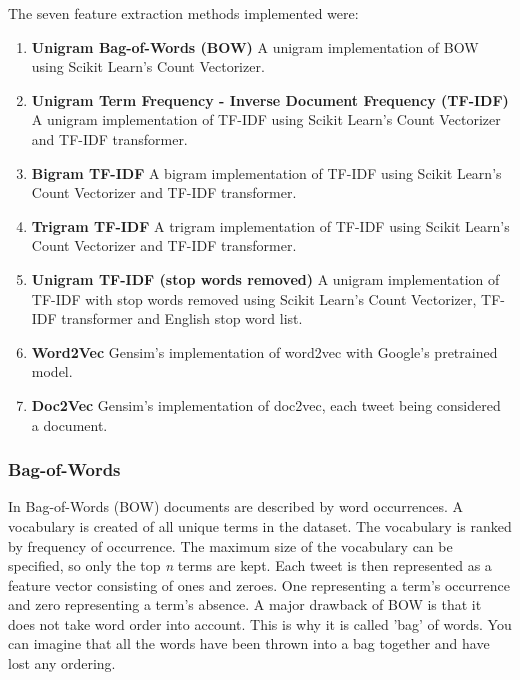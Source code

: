 The seven feature extraction methods implemented were:
\begin{enumerate}
    \item \textbf{Unigram Bag-of-Words (BOW)}\newline
    A unigram implementation of BOW using Scikit Learn's Count Vectorizer.
    \item \textbf{Unigram Term Frequency - Inverse Document Frequency (TF-IDF)}\newline
    A unigram implementation of TF-IDF using Scikit Learn's Count Vectorizer and TF-IDF transformer.
    \item \textbf{Bigram TF-IDF}\newline
    A bigram implementation of TF-IDF using Scikit Learn's Count Vectorizer and TF-IDF transformer.
    \item \textbf{Trigram TF-IDF} \newline
    A trigram implementation of TF-IDF using Scikit Learn's Count Vectorizer and TF-IDF transformer.
    \item \textbf{Unigram TF-IDF (stop words removed)}\newline
    A unigram implementation of TF-IDF with stop words removed using Scikit Learn's Count Vectorizer, TF-IDF transformer and English stop word list.
    \item \textbf{Word2Vec}\newline
    Gensim's implementation of word2vec with Google's pretrained model.    
    \item \textbf{Doc2Vec}\newline
    Gensim's implementation of doc2vec, each tweet being considered a document.
\end{enumerate}

\subsubsection{Bag-of-Words}

In Bag-of-Words (BOW) documents are described by word occurrences. A vocabulary is created of all unique terms in the dataset. The vocabulary is ranked by frequency of occurrence. The maximum size of the vocabulary can be specified, so only the top \textit{n} terms are kept. Each tweet is then represented as a feature vector consisting of ones and zeroes. One representing a term's occurrence and zero representing a term's absence. A major drawback of BOW is that it does not take word order into account. This is why it is called 'bag' of words. You can imagine that all the words have been thrown into a bag together and have lost any ordering.


